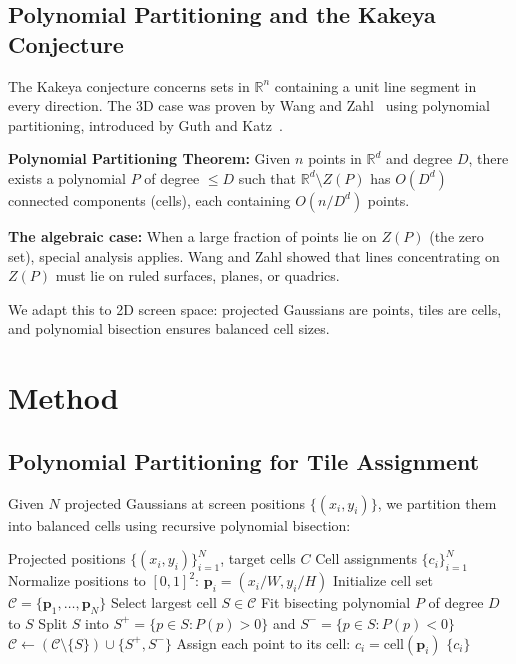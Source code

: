 \documentclass[10pt,twocolumn]{article}
\begin{document}
\subsection{Polynomial Partitioning and the Kakeya Conjecture}

The Kakeya conjecture concerns sets in $\mathbb{R}^n$ containing a unit line segment in every direction. The 3D case was proven by Wang and Zahl~\cite{wang2025kakeya} using polynomial partitioning, introduced by Guth and Katz~\cite{guth2015kakeya}.

\textbf{Polynomial Partitioning Theorem:} Given $n$ points in $\mathbb{R}^d$ and degree $D$, there exists a polynomial $P$ of degree $\leq D$ such that $\mathbb{R}^d \setminus Z(P)$ has $O(D^d)$ connected components (cells), each containing $O(n/D^d)$ points.

\textbf{The algebraic case:} When a large fraction of points lie on $Z(P)$ (the zero set), special analysis applies. Wang and Zahl showed that lines concentrating on $Z(P)$ must lie on ruled surfaces, planes, or quadrics.

We adapt this to 2D screen space: projected Gaussians are points, tiles are cells, and polynomial bisection ensures balanced cell sizes.

\section{Method}

\subsection{Polynomial Partitioning for Tile Assignment}

Given $N$ projected Gaussians at screen positions $\{(x_i, y_i)\}$, we partition them into balanced cells using recursive polynomial bisection:

\begin{algorithm}[H]
\caption{Polynomial Partitioning Tile Assignment}
\begin{algorithmic}[1]
\REQUIRE Projected positions $\{(x_i, y_i)\}_{i=1}^N$, target cells $C$
\ENSURE Cell assignments $\{c_i\}_{i=1}^N$
\STATE Normalize positions to $[0,1]^2$: $\mathbf{p}_i = (x_i/W, y_i/H)$
\STATE Initialize cell set $\mathcal{C} = \{\mathbf{p}_1, \ldots, \mathbf{p}_N\}$
    \STATE Select largest cell $S \in \mathcal{C}$
    \STATE Fit bisecting polynomial $P$ of degree $D$ to $S$
    \STATE Split $S$ into $S^+ = \{p \in S : P(p) > 0\}$ and $S^- = \{p \in S : P(p) < 0\}$
    \STATE $\mathcal{C} \leftarrow (\mathcal{C} \setminus \{S\}) \cup \{S^+, S^-\}$
\ENDWHILE
\STATE Assign each point to its cell: $c_i = \text{cell}(\mathbf{p}_i)$
\RETURN $\{c_i\}$
\end{algorithmic}
\end{algorithm}
\end{document}

